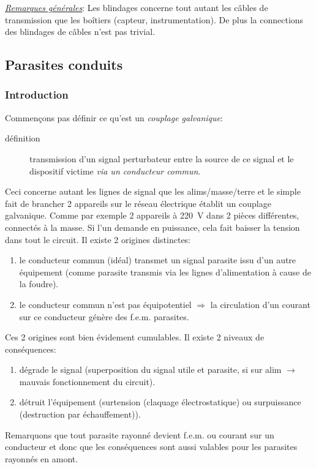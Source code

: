 \underline{\textit{Remarques générales}}: Les blindages concerne tout autant les câbles de transmission que les boîtiers (capteur, instrumentation). De plus la connections des blindages de câbles n'est pas trivial.
\subsection{Parasites conduits}
\subsubsection{Introduction}
Commençons pas définir ce qu'est un \emph{couplage galvanique}:
\begin{description}
	\item[définition] transmission d'un signal perturbateur entre la source de ce signal et le dispositif victime \emph{via un conducteur commun}.
\end{description}
Ceci concerne autant les lignes de signal que les alims/masse/terre et le simple fait de brancher 2 appareils sur le réseau électrique établit un couplage galvanique. Comme par exemple 2 appareils à \SI{220}{\volt} dans 2 pièces différentes, connectés à la masse. Si l'un demande en puissance, cela fait baisser la tension dans tout le circuit. Il existe 2 origines distinctes:
\begin{enumerate}
	\item le conducteur commun (idéal) transmet un signal parasite issu d'un autre équipement (comme parasite transmis via les lignes d'alimentation à cause de la foudre).
	\item le conducteur commun n'est pas équipotentiel \(\Rightarrow\) la circulation d'un courant sur ce conducteur génère des f.e.m. parasites.
\end{enumerate}
Ces 2 origines sont bien évidement cumulables. Il existe 2 niveaux de conséquences:
\begin{enumerate}
	\item dégrade le signal (superposition du signal utile et parasite, si sur alim \(\rightarrow\) mauvais fonctionnement du circuit).
	\item détruit l'équipement (surtension (claquage électrostatique) ou surpuissance (destruction par échauffement)).
\end{enumerate}
Remarquons que tout parasite rayonné devient f.e.m. ou courant sur un conducteur et donc que les conséquences sont aussi valables pour les parasites rayonnés en amont.
